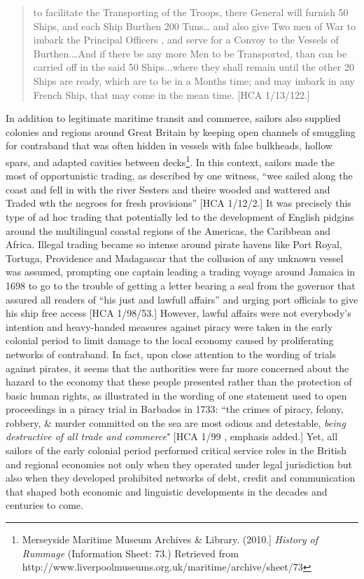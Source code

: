 \begin{quotation}
to facilitate the Transporting of the Troops, there General will furnish 50 Ships, and each Ship Burthen 200 Tuns… and also give Two men of War to imbark the Principal Officers , and serve for a Convoy to the Vessels of Burthen.…And if there be any more Men to be Transported, than can be carried off in the said 50 Ships...where they shall remain until the other 20 Ships are ready, which are to be in a Months time; and may imbark in any French Ship, that may come in the mean time. [HCA 1/13/122.]\end{quotation}

In addition to legitimate maritime transit and commerce, sailors also supplied colonies and regions around Great Britain by keeping open channels of smuggling for contraband that was often hidden in vessels with false bulkheads, hollow spars, and adapted cavities between decks\footnote{Merseyside Maritime Museum Archives \& Library. (2010.]  \textit{History of Rummage} (Information Sheet: 73.) Retrieved from http://www.liverpoolmuseums.org.uk/maritime/archive/sheet/73}. In this context, sailors made the most of opportunistic trading, as described by one witness, “wee sailed along the coast and fell in with the river Sesters and theire wooded and wattered and Traded wth the negroes for fresh provisions” [HCA 1/12/2.] It was precisely this type of ad hoc trading that potentially led to the development of English pidgins around the multilingual coastal regions of the Americas, the Caribbean and Africa. Illegal trading became so intense around pirate havens like Port Royal, Tortuga, Providence and Madagascar that the collusion of any unknown vessel was assumed, prompting one captain leading a trading voyage around Jamaica in 1698 to go to the trouble of getting a letter bearing a seal from the governor that assured all readers of “his just and lawfull affairs” and urging port officials to give his ship free access [HCA 1/98/53.] However, lawful affairs were not everybody’s intention and heavy-handed measures against piracy were taken in the early colonial period to limit damage to the local economy caused by proliferating networks of contraband. In fact, upon close attention to the wording of trials against pirates, it seems that the authorities were far more concerned about the hazard to the economy that these people presented rather than the protection of basic human rights, as illustrated in the wording of one statement used to open proceedings in a piracy trial in Barbados in 1733: “the crimes of piracy, felony, robbery, \& murder committed on the sea are most odious and detestable, \textit{being destructive of all trade and commerce}" [HCA 1/99 \citealt{Barbados1733}, emphasis added.] Yet, all sailors of the early colonial period performed critical service roles in the British and regional economies not only when they operated under legal jurisdiction but also when they developed prohibited networks of debt, credit and communication that shaped both economic and linguistic developments in the decades and centuries to come. 

